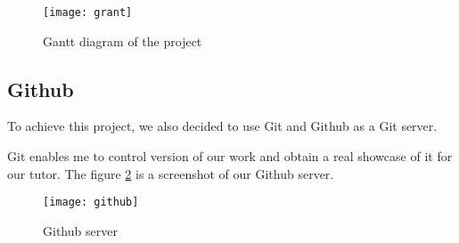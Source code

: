\begin{figure}[h]
  \centering
  \texttt{[image: grant]}
  \caption{Gantt diagram of the project}
  \label{fig:grantt}
\end{figure}


\subsection{Github}

To achieve this project, we also decided to use Git and Github as a Git server. ~\\


Git enables me to control version of our work and obtain a real showcase of it for our tutor. The figure
\ref{fig:github} is a screenshot of our Github server.

\begin{figure}[h]
  \centering
  \texttt{[image: github]}
  \caption{Github server}
  \label{fig:github}
\end{figure}




